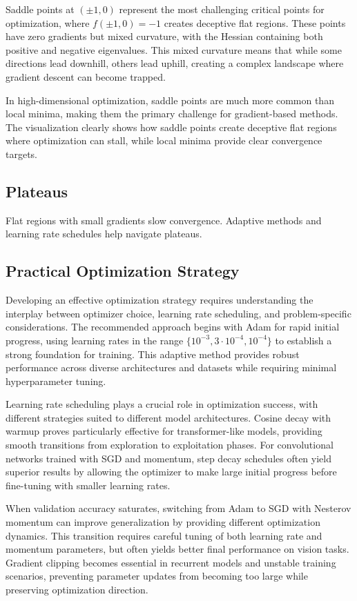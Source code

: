 Saddle points at $(\pm 1,0)$ represent the most challenging critical points for optimization, where $f(\pm 1,0) = -1$ creates deceptive flat regions. These points have zero gradients but mixed curvature, with the Hessian containing both positive and negative eigenvalues. This mixed curvature means that while some directions lead downhill, others lead uphill, creating a complex landscape where gradient descent can become trapped.

In high-dimensional optimization, saddle points are much more common than local minima, making them the primary challenge for gradient-based methods. The visualization clearly shows how saddle points create deceptive flat regions where optimization can stall, while local minima provide clear convergence targets.

\subsection{Plateaus}

Flat regions with small gradients slow convergence. Adaptive methods and learning rate schedules help navigate plateaus.

\subsection{Practical Optimization Strategy}

Developing an effective optimization strategy requires understanding the interplay between optimizer choice, learning rate scheduling, and problem-specific considerations. The recommended approach begins with Adam for rapid initial progress, using learning rates in the range $\{10^{-3},3\cdot10^{-4},10^{-4}\}$ to establish a strong foundation for training. This adaptive method provides robust performance across diverse architectures and datasets while requiring minimal hyperparameter tuning.

Learning rate scheduling plays a crucial role in optimization success, with different strategies suited to different model architectures. Cosine decay with warmup proves particularly effective for transformer-like models, providing smooth transitions from exploration to exploitation phases. For convolutional networks trained with SGD and momentum, step decay schedules often yield superior results by allowing the optimizer to make large initial progress before fine-tuning with smaller learning rates.

When validation accuracy saturates, switching from Adam to SGD with Nesterov momentum can improve generalization by providing different optimization dynamics. This transition requires careful tuning of both learning rate and momentum parameters, but often yields better final performance on vision tasks. Gradient clipping becomes essential in recurrent models and unstable training scenarios, preventing parameter updates from becoming too large while preserving optimization direction.

